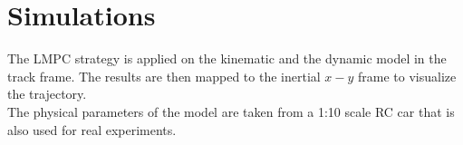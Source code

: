 
\section{Simulations}
The LMPC strategy is applied on the kinematic and the dynamic model in the track frame. The results are then mapped to the inertial $x-y$ frame to visualize the trajectory.\\
The physical parameters of the model are taken from a 1:10 scale RC car that is also used for real experiments.


